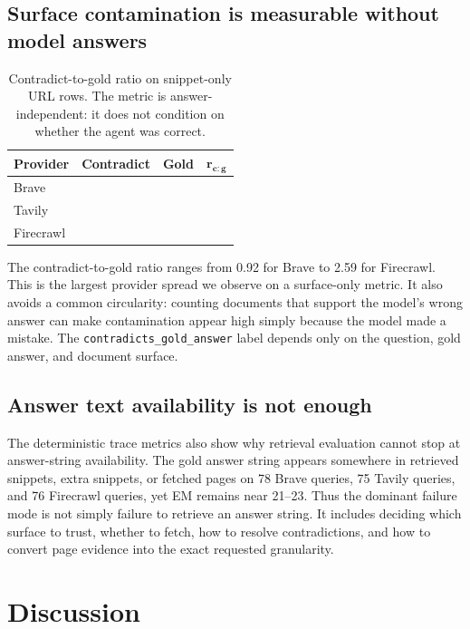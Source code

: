 \documentclass[11pt]{article}
\newcommand{\contraGold}{\texttt{contradicts\_gold\_answer}}
\begin{document}
\subsection{Surface contamination is measurable without model answers}

\begin{table}[t]
\centering
\small
\begin{tabular}{lrrr}
\toprule
\textbf{Provider} & \textbf{Contradict} & \textbf{Gold} & $\boldsymbol{r_{c:g}}$ \\
\midrule
Brave & \BraveContraURLs{} & \BraveGoldURLs{} & \textbf{\BraveContraRatio{}} \\
Tavily & \TavilyContraURLs{} & \TavilyGoldURLs{} & \TavilyContraRatio{} \\
Firecrawl & \FirecrawlContraURLs{} & \FirecrawlGoldURLs{} & \textbf{\FirecrawlContraRatio{}} \\
\bottomrule
\end{tabular}
\caption{Contradict-to-gold ratio on snippet-only URL rows. The metric is answer-independent: it does not condition on whether the agent was correct.}
\label{tab:contamination}
\end{table}

The contradict-to-gold ratio ranges from 0.92 for Brave to 2.59 for Firecrawl. This is the largest provider spread we observe on a surface-only metric. It also avoids a common circularity: counting documents that support the model's wrong answer can make contamination appear high simply because the model made a mistake. The \contraGold{} label depends only on the question, gold answer, and document surface.

\subsection{Answer text availability is not enough}

The deterministic trace metrics also show why retrieval evaluation cannot stop at answer-string availability. The gold answer string appears somewhere in retrieved snippets, extra snippets, or fetched pages on 78 Brave queries, 75 Tavily queries, and 76 Firecrawl queries, yet EM remains near 21--23. Thus the dominant failure mode is not simply failure to retrieve an answer string. It includes deciding which surface to trust, whether to fetch, how to resolve contradictions, and how to convert page evidence into the exact requested granularity.

\section{Discussion}
\label{sec:discussion}
\end{document}
